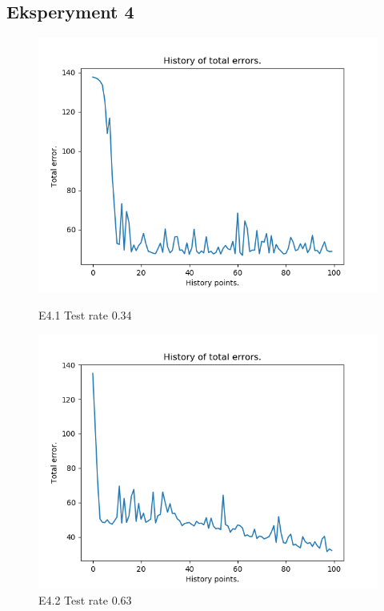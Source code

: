 \documentclass{classrep}
\begin{document}
	\subsection{Eksperyment 4}
		\begin{figure}[H]
			\begin{minipage}{0.5\linewidth}
				\centering
				\includegraphics[scale=0.25]{seeds_nn_i500.png}
				\caption{E4.1 Test rate  0.34}
			\end{minipage}
			\begin{minipage}{0.5\linewidth}
				\centering
				\includegraphics[scale=0.25]{seeds_nn_i1500.png}
				\caption{E4.2 Test rate  0.63}
				\label{E4.2}
			\end{minipage}

\end{figure}
\end{document}
